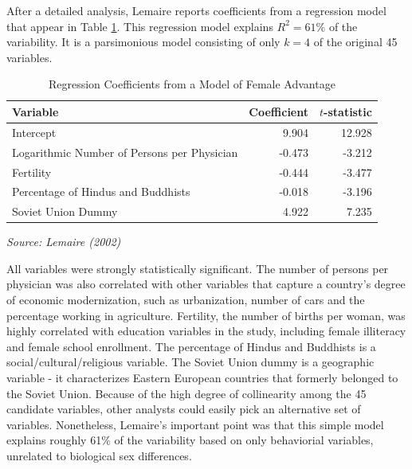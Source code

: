 After a detailed analysis, Lemaire reports coefficients from a
regression model that appear in Table \ref{T6:FemaleAdvantage}. This
regression model explains $R^2 = 61\%$ of the variability. It is a
parsimonious model consisting of only $k=4$ of the original 45
variables.

  \begin{center}  \begin{table}[h]
\caption{\label{T6:FemaleAdvantage} Regression Coefficients from a
Model of Female Advantage}
\begin{tabular}{l|rr}
\hline Variable & Coefficient & $t$-statistic \\
\hline
Intercept & 9.904 &  12.928\\
Logarithmic Number of Persons per Physician & -0.473 & -3.212\\
Fertility & -0.444 &  -3.477\\
Percentage of Hindus and Buddhists & -0.018 & -3.196 \\
Soviet Union Dummy & 4.922 & 7.235\\
\hline
\end{tabular}
\newline
\textit{Source: Lemaire (2002)}
\end{table}  \end{center}  

All variables were strongly statistically significant. The number of
persons per physician was also correlated with other variables that
capture a country's degree of economic modernization, such as
urbanization, number of cars and the percentage working in
agriculture. Fertility, the number of births per woman, was highly
correlated with education variables in the study, including female
illiteracy and female school enrollment. The percentage of Hindus
and Buddhists is a social/cultural/religious variable. The Soviet
Union dummy is a geographic variable - it characterizes Eastern
European countries that formerly belonged to the Soviet Union.
Because of the high degree of collinearity among the 45 candidate
variables, other analysts could easily pick an alternative set of
variables. Nonetheless, Lemaire's important point was that this
simple model explains roughly 61\% of the variability based on only
behaviorial variables, unrelated to biological sex differences.

\linejed



